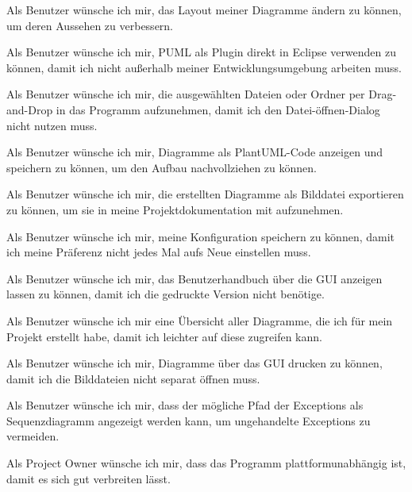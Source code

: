 Als Benutzer wünsche ich mir, das Layout meiner Diagramme ändern zu können, um deren Aussehen zu verbessern.
\nsecend

Als Benutzer wünsche ich mir, PUML als Plugin direkt in Eclipse verwenden zu können, damit ich nicht außerhalb meiner Entwicklungsumgebung arbeiten muss.
\nsecend

Als Benutzer wünsche ich mir, die ausgewählten Dateien oder Ordner per Drag-and-Drop in das Programm aufzunehmen, damit ich den Datei-öffnen-Dialog nicht nutzen muss.
\nsecend

Als Benutzer wünsche ich mir, Diagramme als PlantUML-Code anzeigen und speichern zu können, um den Aufbau nachvollziehen zu können.
\nsecend

Als Benutzer wünsche ich mir, die erstellten Diagramme als Bilddatei exportieren zu können, um sie in meine Projektdokumentation mit aufzunehmen.
\nsecend

Als Benutzer wünsche ich mir, meine Konfiguration speichern zu können, damit ich meine Präferenz nicht jedes Mal aufs Neue einstellen muss.
\nsecend

Als Benutzer wünsche ich mir, das Benutzerhandbuch über die GUI anzeigen lassen zu können, damit ich die gedruckte Version nicht benötige.
\nsecend

Als Benutzer wünsche ich mir eine Übersicht aller Diagramme, die ich für mein Projekt erstellt habe, damit ich leichter auf diese zugreifen kann.
\nsecend

Als Benutzer wünsche ich mir, Diagramme über das GUI drucken zu können, damit ich die Bilddateien nicht separat öffnen muss.
\nsecend

Als Benutzer wünsche ich mir, dass der mögliche Pfad der Exceptions als Sequenzdiagramm angezeigt werden kann, um ungehandelte Exceptions zu vermeiden.
\nsecend

Als Project Owner wünsche ich mir, dass das Programm plattformunabhängig ist, damit es sich gut verbreiten lässt.
\nsecend
\nsecend
